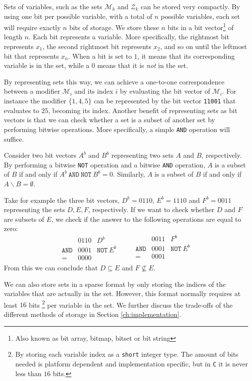Sets of variables, such as the sets $\mathcal{M}_k$ and $\mathcal{Z}_k$ can be
stored very compactly.
By using one bit per possible variable, with a total of $n$ possible variables,
each set will require exactly $n$ bits of storage.
We store these $n$ bits in a bit vector\footnote{Also known as bit array,
bitmap, bitset or bit string} of length $n$.
Each bit represents a variable. More specifically, the rightmost bit represents
$x_1$, the second rightmost bit represents $x_2$, and so on until the leftmost
bit that represents $x_n$.
When a bit is set to $1$, it means that its corresponding variable is in
the set, while a $0$ means that it is \emph{not} in the set.

By representing sets this way, we can achieve a one-to-one correspondence
between a modifier $\mathcal{M}_i$ and its index $i$ by evaluating the bit
vector of $\mathcal{M}_i$. For instance the modifier $\{ {1,4,5} \}$ can be
represented by the bit vector \texttt{11001} that evaluates to $25$, becoming
its index. Another benefit of representing sets as bit vectors is
that we can check whether a set is a
subset of another set by performing bitwise operations. More specifically,
a simple \texttt{AND} operation will suffice.

Consider two bit vectors $A^b$ and $B^b$ representing two sets $A$ and
$B$, respectively.
By performing a bitwise \texttt{NOT} operation and a bitwise \texttt{AND}
operation, $A$ is a subset of $B$ if and only if
$A^b~\texttt{AND}~\texttt{NOT}~B^b = 0$.
Similarly, $A$ is a subset of $B$ if and only if $A \backslash B = \emptyset$.

Take for example the three bit vectors, $D^b = 0110$, $E^b = 1110$ and
$F^b = 0011$ representing the sets $D, E, F$, respectively.
If we want to check whether $D$ and $F$ are subsets of $E$, we check if the
answer to the following operations are equal to zero:
\[
\begin{array}{lrl}
                 & 0110 & D^b \\
    \texttt{AND} & 0001 & \texttt{NOT}~E^b \\ \hline
    =            & 0000
\end{array}
\qquad
\begin{array}{lrl}
                 & 0011 & F^b \\
    \texttt{AND} & 0001 & \texttt{NOT}~E^b \\ \hline
    =            & 0001 \\
\end{array}
\]
From this we can conclude that $D \subseteq E$ and $F \not\subseteq E$.

We can also store sets in a sparse
format by only storing the indices of the variables that are actually in the
set.
However, this format normally requires at least $16$ bits\nolinebreak
\footnote{By storing each variable index as a \texttt{short} integer type.
The amount of bits needed is platform dependent and implementation specific,
but in \texttt{C} it is never less than $16$ bits.}
per variable in the set.
We further discuss the trade-offs of the different methods of storage in
Section \ref{ch:implementation}.
